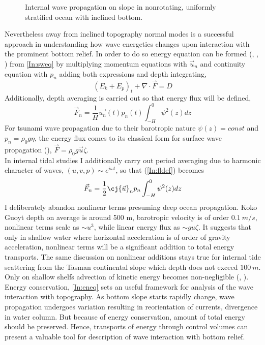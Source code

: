 \begin{figure}
\caption{Internal wave propagation on slope in nonrotating, uniformly stratified ocean with inclined bottom.}
\end{figure}
Nevertheless away from inclined topography normal modes is a successful approach in understanding how wave energetics changes upon interaction with the prominent bottom relief. In order to do so energy equation can be formed (\cite{nekrasov1990energy}, \cite{kowalik2013oceanography}, \cite{kelly2012cascade}) from \eqref{In:sweq} by multiplying momentum equations with $\vec{u}_n$ and continuity equation with $p_n$ adding both expressions and depth integrating,
\begin{equation}
(E_k + E_p)_t + \nabla \cdot \vec{F} = D \label{In:eneq}
\end{equation}
Additionally, depth averaging is carried out so that energy flux will be defined,
\begin{equation}
\vec{F}_n = \frac{1}{H} \vec{u_n}(t) p_n(t) \int_{-H}^0 \psi^2(z) dz \label{In:fldef}
\end{equation}
For tsunami wave propagation due to their barotropic nature $\psi(z) = const$ and $p_n = \rho_0 g \eta$, the energy flux comes to its classical form for surface wave propagation  (\cite{henry2001representation}), $\vec{F} = \rho_0 g \vec{u} \zeta$.\\
In internal tidal studies I additionally carry out period averaging due to harmonic character of waves, $(u,v,p) \sim e^{i \omega t}$, so that (\ref{In:fldef}) becomes
\begin{align}
\vec{F}_n = \frac{1}{2} \cj{\vec{u}}_n p_n \int_{-H}^0 \psi^2(z) dz
\end{align}
I deliberately abandon nonlinear terms presuming deep ocean propagation. Koko Guoyt depth on average is around 500 m, barotropic velocity is of order $0.1~m/s$, nonlinear terms scale as $\sim u^3$, while linear energy flux as $\sim g u \zeta$. It suggests that only in shallow water where horizontal acceleration is of order of gravity acceleration, nonlinear terms will be a significant addition to total energy transports. The same discussion on nonlinear additions stays true for internal tide scattering from the Tasman continental slope which depth does not exceed $100~m$. Only on shallow shelfs advection of kinetic energy becomes non-negligible (\cite{kang2012energetics}, \cite{nash2012unpredictable}).\\
Energy conservation, \ref{In:eneq} sets an useful framework for analysis of the wave interaction with topography. As bottom slope starts rapidly change, wave propagation undergoes variation resulting in reorientation of currents, divergence in water column. But because of energy conservation, amount of total energy should be preserved. Hence, transports of energy through control volumes can present a valuable tool for description of wave interaction with bottom relief.\\

